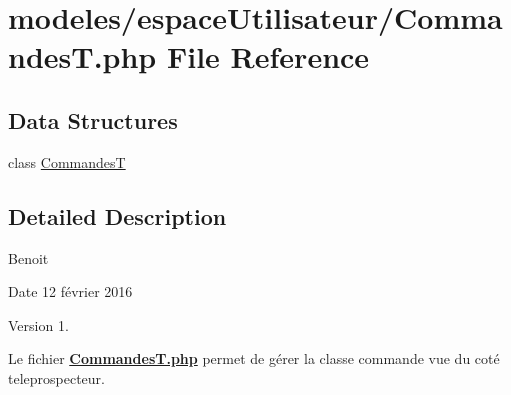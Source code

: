 \hypertarget{_commandes_t_8php}{}\section{modeles/espace\+Utilisateur/\+CommandesT.php File Reference}
\label{_commandes_t_8php}
\subsection*{Data Structures}
\begin{DoxyCompactItemize}
\item 
class \hyperlink{class_commandes_t}{CommandesT}
\end{DoxyCompactItemize}


\subsection{Detailed Description}
Benoit \begin{DoxyDate}{Date}
12 février 2016 
\end{DoxyDate}
\begin{DoxyVersion}{Version}
1.
\end{DoxyVersion}
Le fichier {\bfseries \hyperlink{_commandes_t_8php}{Commandes\+T.\+php}} permet de gérer la classe commande vue du coté teleprospecteur. 